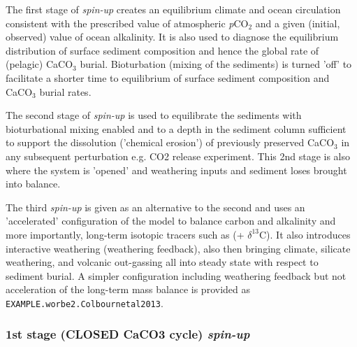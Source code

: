 \documentclass[10pt,twoside]{article}
\begin{document}
        \begin{compactenum}
        
                \item The first stage of \textit{spin-up} creates an equilibrium climate and ocean circulation consistent with the prescribed value of atmospheric \textit{p}CO$_{2}$ and a given (initial, observed) value of ocean alkalinity. It is also used to diagnose the equilibrium distribution of surface sediment composition and hence the global rate of (pelagic) CaCO$_{3}$ burial. Bioturbation (mixing of the sediments) is turned 'off' to facilitate a shorter time to equilibrium of surface sediment composition and CaCO$_{3}$ burial rates.
                
                \item The second stage of \textit{spin-up} is used to equilibrate the sediments with bioturbational mixing enabled and to a depth in the sediment column sufficient to support the dissolution ('chemical erosion') of previously preserved CaCO$_{3}$ in any subsequent perturbation e.g. CO2 release experiment. This 2nd stage is also where the system is 'opened' and weathering inputs and sediment loses brought into balance. 
                
                \item The third \textit{spin-up} is given as an alternative to the second and uses an 'accelerated' configuration of the model to balance carbon and alkalinity and more importantly, long-term isotopic tracers such as (+ $\delta^{13}$C). It also introduces interactive weathering (weathering feedback), also then bringing climate, silicate weathering, and volcanic out-gassing all into steady state with respect to sediment burial. A simpler configuration including weathering feedback but not acceleration of the long-term mass balance is provided as \texttt{EXAMPLE.worbe2.Colbournetal2013}.
                
        \end{compactenum}


\subsubsection{1st stage (CLOSED CaCO3 cycle) \textit{spin-up}}\label{EXAMPLE.worbe2.RidgwellHargreaves1997_S36x36.SPIN1}
\end{document}

